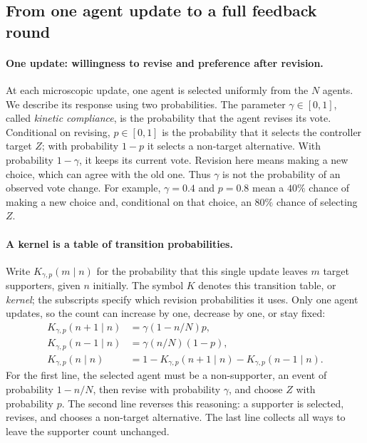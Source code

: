 \subsection{From one agent update to a full feedback round}

\paragraph{One update: willingness to revise and preference after revision.}
At each microscopic update, one agent is selected uniformly from the $N$
agents. We describe its response using two probabilities. The parameter
$\gamma\in[0,1]$, called \emph{kinetic compliance}, is the probability that
the agent revises its vote. Conditional on revising, $p\in[0,1]$ is the
probability that it selects the controller target $Z$; with probability
$1-p$ it selects a non-target alternative. With probability $1-\gamma$,
it keeps its current vote. Revision here means making a new choice, which
can agree with the old one. Thus $\gamma$ is not the probability of an
observed vote change. For example, $\gamma=0.4$ and $p=0.8$ mean a
$40\%$ chance of making a new choice and, conditional on that choice, an
$80\%$ chance of selecting $Z$.

\paragraph{A kernel is a table of transition probabilities.}
Write $K_{\gamma,p}(m\mid n)$ for the probability that this single update
leaves $m$ target supporters, given $n$ initially. The symbol $K$ denotes
this transition table, or \emph{kernel}; the subscripts specify which
revision probabilities it uses. Only one agent updates, so the count can
increase by one, decrease by one, or stay fixed:
\begin{align}
K_{\gamma,p}(n+1\mid n)&=\gamma(1-n/N)p,\\
K_{\gamma,p}(n-1\mid n)&=\gamma(n/N)(1-p),\\
K_{\gamma,p}(n\mid n)&=1-K_{\gamma,p}(n+1\mid n)-K_{\gamma,p}(n-1\mid n).
\label{eq:single_affinity_kernel}
\end{align}
For the first line, the selected agent must be a non-supporter, an event
of probability $1-n/N$, then revise with probability $\gamma$, and choose
$Z$ with probability $p$. The second line reverses this reasoning: a
supporter is selected, revises, and chooses a non-target alternative.
The last line collects all ways to leave the supporter count unchanged.

